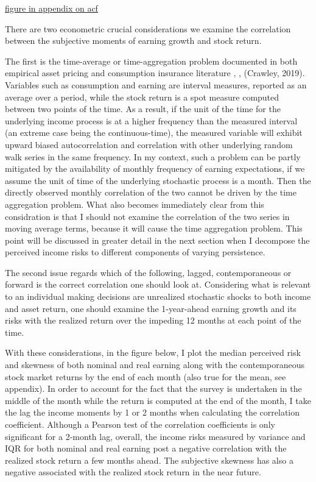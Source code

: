 \documentclass[12pt,notitlepage,onecolumn,aps,pra]{revtex4-1}
\begin{document}
\href{appendix/acfpot.jpg}{figure in appendix on acf}

There are two econometric crucial considerations we examine the
correlation between the subjective moments of earning growth and stock
return.

The first is the time-average or time-aggregation problem documented in
both empirical asset pricing and consumption insurance literature
\cite{working_note_1960}, \cite{jagannathan_lazy_2007}, (Crawley, 2019).
Variables such as consumption and earning are interval measures,
reported as an average over a period, while the stock return is a spot
measure computed between two points of the time. As a result, if the
unit of the time for the underlying income process is at a higher
frequency than the measured interval (an extreme case being the
continuous-time), the measured variable will exhibit upward biased
autocorrelation and correlation with other underlying random walk series
in the same frequency. In my context, such a problem can be partly
mitigated by the availability of monthly frequency of earning
expectations, if we assume the unit of time of the underlying stochastic
process is a month. Then the directly observed monthly correlation of
the two cannot be driven by the time aggregation problem. What also
becomes immediately clear from this considration is that I should not
examine the correlation of the two series in moving average terms,
because it will cause the time aggregation problem. This point will be
discussed in greater detail in the next section when I decompose the
perceived income risks to different components of varying persistence.

The second issue regards which of the following, lagged, contemporaneous
or forward is the correct correlation one should look at. Considering
what is relevant to an individual making decisions are unrealized
stochastic shocks to both income and asset return, one should examine
the 1-year-ahead earning growth and its risks with the realized return
over the impeding 12 months at each point of the time.

With these considerations, in the figure below, I plot the median
perceived risk and skewness of both nominal and real earning along with
the contemporaneous stock market returns by the end of each month (also
true for the mean, see appendix). In order to account for the fact that
the survey is undertaken in the middle of the month while the return is
computed at the end of the month, I take the lag the income moments by 1
or 2 months when calculating the correlation coefficient. Although a
Pearson test of the correlation coefficients is only significant for a
2-month lag, overall, the income risks measured by variance and IQR for
both nominal and real earning post a negative correlation with the
realized stock return a few months ahead. The subjective skewness has
also a negative associated with the realized stock return in the near
future.
\end{document}
